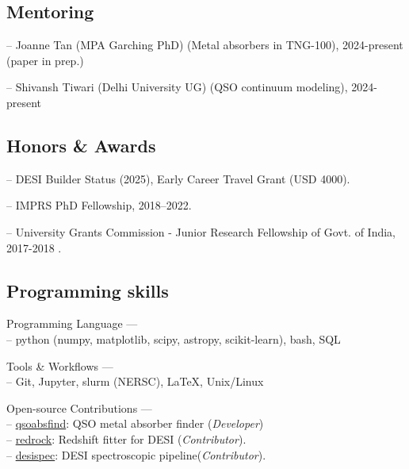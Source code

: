 \documentclass[12pt,letterpaper]{article}
\begin{document}
\subsection{Mentoring}
  \vspace{-1mm}
\begin{list}{}{\cvlist}
\item -- Joanne Tan (MPA Garching PhD) (Metal absorbers in TNG-100), 2024-present (paper in prep.)
\item -- Shivansh Tiwari (Delhi University UG) (QSO continuum modeling), 2024-present
\end{list}
  \vspace{-2mm}
\subsection{Honors \& Awards}

\begin{list}{}{\cvlist}
  \item -- DESI Builder Status (2025), Early Career Travel Grant (USD 4000).
  \item -- IMPRS PhD Fellowship, 2018--2022.
  \item -- University Grants Commission - Junior Research Fellowship of Govt. of India, 2017-2018 .
\end{list}

\subsection{Programming skills}
\begin{list}{}{\cvlist}
\item Programming Language ---\\
   -- python (numpy, matplotlib, scipy, astropy, scikit-learn), bash, SQL
  \item Tools \& Workflows ---\\
  -- Git, Jupyter, slurm (NERSC), LaTeX, Unix/Linux  
\item Open-source Contributions ---\\
   -- \href{https://github.com/abhi0395/qsoabsfind}{qsoabsfind}: QSO metal absorber finder (\textit{Developer})\\
   -- \href{https://github.com/desihub/redrock}{redrock}: Redshift fitter for DESI (\textit{Contributor}).\\
   -- \href{https://github.com/desihub/desispec}{desispec}: DESI spectroscopic pipeline(\textit{Contributor}).
\end{list}
\end{document}
